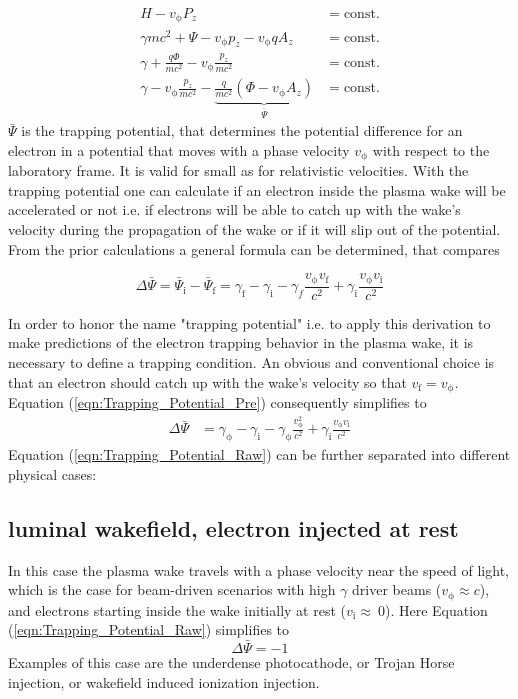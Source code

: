 \begin{align}
H-v_\mathrm{\phi}P_z &= \mathrm{const.}\\
\gamma m c^2+\Psi-v_\mathrm{\phi}p_z-v_\mathrm{\phi}qA_z &= \mathrm{const.}\\
\gamma+\frac{q \Phi}{m c^2}-v_\mathrm{\phi} \frac{p_z}{mc^2} &= \mathrm{const.}\\
\gamma - v_\mathrm{\phi} \frac{p_z}{mc^2}- \underbrace{\frac{q}{mc^2}(\Phi-v_\mathrm{\phi}A_z)}_{\bar{\Psi}}  &= \mathrm{const.} 
\end{align}
$\bar{\Psi}$ is the trapping potential, that determines the potential difference for an electron in a potential that moves with a phase velocity $v_\mathrm{\phi}$ with respect to the laboratory frame. It is valid for small as for relativistic velocities.
With the trapping potential one can calculate if an electron inside the plasma wake will be accelerated or not i.e. if electrons will be able to catch up with the wake's velocity during the propagation of the wake or if it will slip out of the potential.
From the prior calculations a general formula can be determined, that compares

\begin{equation}
\label{eqn:Trapping_Potential_Pre}
\Delta \bar{\Psi}= \bar{\Psi}_\mathrm{i}-\bar{\Psi}_\mathrm{f}=\gamma_\mathrm{f}-\gamma_\mathrm{i}-\gamma_f\frac{v_\mathrm{\phi}v_\mathrm{f}}{c^2}+\gamma_\mathrm{i}\frac{v_\mathrm{\phi}v_\mathrm{i}}{c^2} 
\end{equation}

In order to honor the name "trapping potential" i.e. to apply this derivation to make predictions of the electron trapping behavior in the plasma wake, it is necessary to define a trapping condition. 
An obvious and conventional choice is that an electron should catch up with the wake's velocity so that 
$v_\mathrm{f}=v_\mathrm{\phi}$.
Equation (\ref{eqn:Trapping_Potential_Pre}) consequently simplifies to 
\begin{align}
\label{eqn:Trapping_Potential_Raw}
\Delta \bar{\Psi}&= \gamma_\mathrm{\phi}-\gamma_\mathrm{i}-\gamma_\mathrm{\phi}\frac{v_\mathrm{\phi}^2}{c^2}+\gamma_\mathrm{i}\frac{v_\mathrm{\phi}v_\mathrm{i}}{c^2} 
\end{align}
Equation (\ref{eqn:Trapping_Potential_Raw}) can be further separated into different physical cases:
\subsection*{luminal wakefield, electron injected  at rest}
In this case the plasma wake travels with a phase velocity near the speed of light, which is the case for beam-driven scenarios with high $\gamma$ driver beams ($v_\mathrm{\phi} \approx c$), and electrons starting inside the wake initially at rest ($v_\mathrm{i} \approx \ 0$).
Here Equation (\ref{eqn:Trapping_Potential_Raw}) simplifies to
\begin{equation}
\label{eqn:Trapping_Potential_TH}
\Delta \bar{\Psi}=-1
\end{equation}
Examples of this case are the underdense photocathode, or Trojan Horse injection\cite{Hidding_PRL_2012}, or wakefield induced ionization injection\cite{MartinezdelaOssa2014231}.

